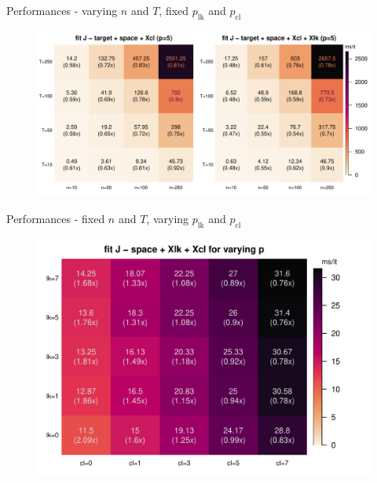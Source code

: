 \documentclass[
	11pt, %
 xcolor={dvipsnames,svgnames}
]{beamer}
\begin{document}
\begin{frame}{Performances - varying $n$ and $T$, fixed $p_\text{lk}$ and $p_\text{cl}$}
\begin{figure}[!ht]
    \centering
    \includegraphics[width=1\linewidth]{Testing/Scaling possibilities/target_space_covariates.pdf}
    \label{fig: scaling target space covariates}
\end{figure}
\end{frame}

\begin{frame}{Performances - fixed $n$ and $T$, varying $p_\text{lk}$ and $p_\text{cl}$}
\begin{figure}[!ht]
    \centering
    \includegraphics[width=0.8\linewidth]{Testing/Scaling possibilities/test_varying_p.pdf}
    \label{fig: test varying p}
\end{figure}
\end{frame}
\end{document}
